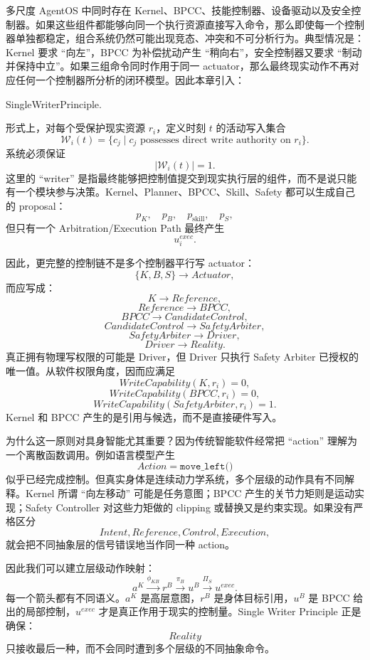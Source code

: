 多尺度 AgentOS 中同时存在 Kernel、BPCC、技能控制器、设备驱动以及安全控制器。如果这些组件都能够向同一个执行资源直接写入命令，那么即使每一个控制器单独都稳定，组合系统仍然可能出现竞态、冲突和不可分析行为。典型情况是：Kernel 要求 ``向左''，BPCC 为补偿扰动产生 ``稍向右''，安全控制器又要求 ``制动并保持中立''。如果三组命令同时作用于同一 actuator，那么最终现实动作不再对应任何一个控制器所分析的闭环模型。因此本章引入：
\begin{statementbox}
SingleWriterPrinciple.
\end{statementbox}

形式上，对每个受保护现实资源 $r_i$，定义时刻 $t$ 的活动写入集合
\[
\mathcal W_i(t)
=
\{
c_j
\mid
c_j
\text{ possesses direct write authority on }r_i
\}.
\]
系统必须保证
\[
\boxed{
|\mathcal W_i(t)|=1.
}
\]
这里的 ``writer'' 是指最终能够把控制值提交到现实执行层的组件，而不是说只能有一个模块参与决策。Kernel、Planner、BPCC、Skill、Safety 都可以生成自己的 proposal：
\[
p_K,\quad
p_B,\quad
p_{\mathrm{skill}},\quad
p_S,
\]
但只有一个 Arbitration/Execution Path 最终产生
\[
u_i^{exec}.
\]

因此，更完整的控制链不是多个控制器平行写 actuator：
\[
\{K,B,S\}\rightarrow Actuator,
\]
而应写成：
\[
K
\rightarrow
Reference,
\]
\[
Reference
\rightarrow
BPCC,
\]
\[
BPCC
\rightarrow
CandidateControl,
\]
\[
CandidateControl
\rightarrow
SafetyArbiter,
\]
\[
SafetyArbiter
\rightarrow
Driver,
\]
\[
Driver
\rightarrow
Reality.
\]
真正拥有物理写权限的可能是 Driver，但 Driver 只执行 Safety Arbiter 已授权的唯一值。从软件权限角度，因而应满足
\[
WriteCapability(K,r_i)=0,
\]
\[
WriteCapability(BPCC,r_i)=0,
\]
\[
WriteCapability(SafetyArbiter,r_i)=1.
\]
Kernel 和 BPCC 产生的是引用与候选，而不是直接硬件写入。

为什么这一原则对具身智能尤其重要？因为传统智能软件经常把 ``action'' 理解为一个离散函数调用。例如语言模型产生
\[
Action=\texttt{move\_left()}
\]
似乎已经完成控制。但真实身体是连续动力学系统，多个层级的动作具有不同解释。Kernel 所谓 ``向左移动'' 可能是任务意图；BPCC 产生的关节力矩则是运动实现；Safety Controller 对这些力矩做的 clipping 或替换又是约束实现。如果没有严格区分
\[
Intent,
Reference,
Control,
Execution,
\]
就会把不同抽象层的信号错误地当作同一种 action。

因此我们可以建立层级动作映射：
\[
a^K
\overset{\phi_{KB}}{\longrightarrow}
r^B
\overset{\pi_B}{\longrightarrow}
u^B
\overset{\Pi_S}{\longrightarrow}
u^{exec}.
\]
每一个箭头都有不同语义。$a^K$ 是高层意图，$r^B$ 是身体目标引用，$u^B$ 是 BPCC 给出的局部控制，$u^{exec}$ 才是真正作用于现实的控制量。Single Writer Principle 正是确保：
\[
Reality
\]
只接收最后一种，而不会同时遭到多个层级的不同抽象命令。

